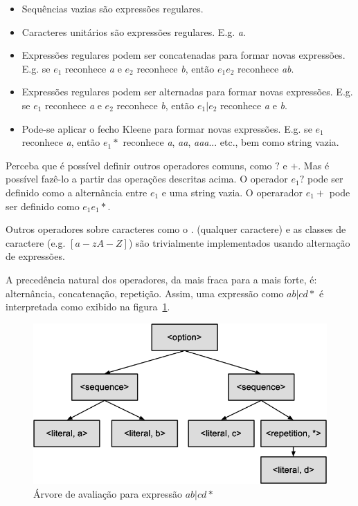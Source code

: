 \documentclass[a4paper,12pt,oneside,onecolumn]{uerj}
\begin{document}
\begin{itemize}
    \item Sequências vazias são expressões regulares.
    \item Caracteres unitários são expressões regulares. E.g. \emph{a}.
    \item Expressões regulares podem ser concatenadas para formar novas expressões. E.g. se $e_1$ reconhece \emph{a} e $e_2$ reconhece \emph{b}, então $e_1e_2$ reconhece \emph{ab}.
    \item Expressões regulares podem ser alternadas para formar novas expressões. E.g. se $e_1$ reconhece \emph{a} e $e_2$ reconhece \emph{b}, então $e_1|e_2$ reconhece \emph{a} e \emph{b}.
    \item Pode-se aplicar o fecho Kleene para formar novas expressões. E.g. se $e_1$ reconhece \emph{a}, então $e_1*$ reconhece \emph{a}, \emph{aa}, \emph{aaa}... etc., bem como string vazia.
\end{itemize}

Perceba que é possível definir outros operadores comuns, como $?$ e $+$. Mas é possível fazê-lo a partir das operações descritas acima. O operador $e_1?$ pode ser definido como a alternância entre $e_1$ e uma string vazia. O operarador $e_1+$ pode ser definido como $e_1e_1*$.

Outros operadores sobre caracteres como o $.$ (qualquer caractere) e as classes de caractere (e.g. $[a-zA-Z]$) são trivialmente implementados usando alternação de expressões.

A precedência natural dos operadores, da mais fraca para a mais forte, é: alternância, concatenação, repetição. Assim, uma expressão como $ab|cd*$ é interpretada como exibido na figura~\ref{fig:abcd_parse_tree}.

\begin{figure}[ht]
  \centering
  \includegraphics[scale=0.4]{figures/abcd_parse_tree.png}
  \caption{Árvore de avaliação para expressão $ab|cd*$}
  \label{fig:abcd_parse_tree}
\end{figure}
\end{document}
